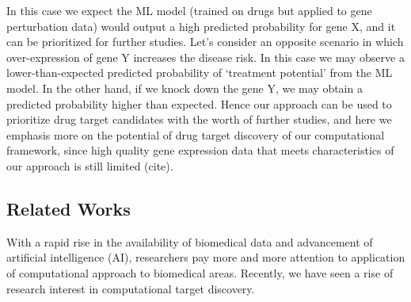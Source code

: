     In this case we expect the ML model (trained on drugs but applied to gene perturbation data) would output a high predicted probability for gene X, and it can be prioritized for further studies. Let’s consider an opposite scenario in which over-expression of gene Y increases the disease risk. In this case we may observe a lower-than-expected predicted probability of ‘treatment potential’ from the ML model. In the other hand, if we knock down the gene Y, we may obtain a predicted probability higher than expected. Hence our approach can be used to prioritize drug target candidates with the worth of further studies, and here we emphasis more on the potential of drug target discovery of our computational framework, since high quality gene expression data that meets characteristics of our approach is still limited (cite).

  \subsection{Related Works}
    With a rapid rise in the availability of biomedical data and advancement of artificial intelligence (AI), researchers pay more and more attention to application of computational approach to biomedical areas. Recently, we have seen a rise of research interest in computational target discovery. 
    
